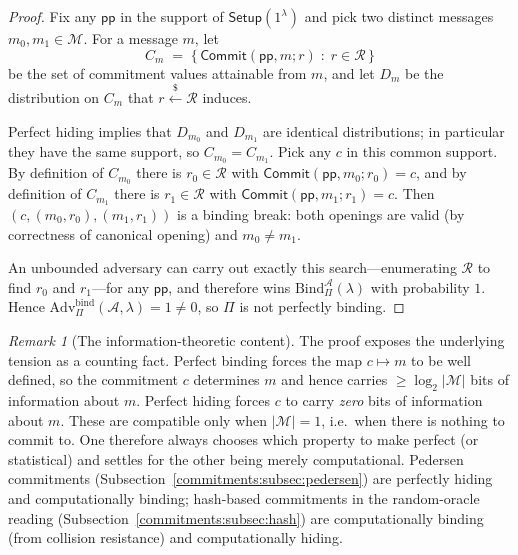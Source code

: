 \documentclass[11pt,a4paper]{article}
\theoremstyle{definition}
\theoremstyle{remark}
\newtheorem{remark}[theorem]{Remark}
\begin{document}
\begin{proof}
Fix any \(\mathsf{pp}\) in the support of \(\mathsf{Setup}(1^\lambda)\) and pick two distinct messages \(m_0, m_1 \in \mathcal{M}\). For a message \(m\), let
\[
  C_m \;=\; \bigl\{\, \mathsf{Commit}(\mathsf{pp}, m; r) \;:\; r \in \mathcal{R} \,\bigr\}
\]
be the set of commitment values attainable from \(m\), and let \(D_m\) be the distribution on \(C_m\) that \(r \xleftarrow{\$} \mathcal{R}\) induces.

Perfect hiding implies that \(D_{m_0}\) and \(D_{m_1}\) are identical distributions; in particular they have the same support, so \(C_{m_0} = C_{m_1}\). Pick any \(c\) in this common support. By definition of \(C_{m_0}\) there is \(r_0 \in \mathcal{R}\) with \(\mathsf{Commit}(\mathsf{pp}, m_0; r_0) = c\), and by definition of \(C_{m_1}\) there is \(r_1 \in \mathcal{R}\) with \(\mathsf{Commit}(\mathsf{pp}, m_1; r_1) = c\). Then \((c, (m_0, r_0), (m_1, r_1))\) is a binding break: both openings are valid (by correctness of canonical opening) and \(m_0 \neq m_1\).

An unbounded adversary can carry out exactly this search---enumerating \(\mathcal{R}\) to find \(r_0\) and \(r_1\)---for any \(\mathsf{pp}\), and therefore wins \(\mathrm{Bind}^{\mathcal{A}}_{\Pi}(\lambda)\) with probability \(1\). Hence \(\mathrm{Adv}^{\mathrm{bind}}_{\Pi}(\mathcal{A}, \lambda) = 1 \neq 0\), so \(\Pi\) is not perfectly binding.
\end{proof}

\begin{remark}[The information-theoretic content]\label{commitments:rem:info-impossibility}
The proof exposes the underlying tension as a counting fact. Perfect binding forces the map \(c \mapsto m\) to be well defined, so the commitment \(c\) determines \(m\) and hence carries \(\ge \log_2 |\mathcal{M}|\) bits of information about \(m\). Perfect hiding forces \(c\) to carry \emph{zero} bits of information about \(m\). These are compatible only when \(|\mathcal{M}| = 1\), i.e.\ when there is nothing to commit to. One therefore always chooses which property to make perfect (or statistical) and settles for the other being merely computational. Pedersen commitments (Subsection~\ref{commitments:subsec:pedersen}) are perfectly hiding and computationally binding; hash-based commitments in the random-oracle reading (Subsection~\ref{commitments:subsec:hash}) are computationally binding (from collision resistance) and computationally hiding.
\end{remark}
\end{document}
